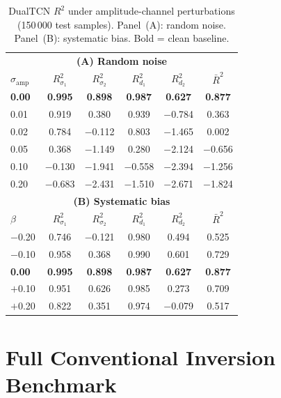 \documentclass[journal]{IEEEtran}
\begin{document}
\begin{table}[t]
  \centering
  \footnotesize
  \caption{DualTCN $R^2$ under amplitude-channel perturbations
  (150\,000 test samples).  Panel~(A): random noise.
  Panel~(B): systematic bias.  Bold = clean baseline.}
  \label{tab:supp_amp}
  \setlength{\tabcolsep}{2pt}
  \begin{tabular}{l@{\;\;}ccccc}
    \toprule
    \multicolumn{6}{c}{\textbf{(A) Random noise}} \\
    $\sigma_\mathrm{amp}$ &
      $R^2_{\sigma_1}$ & $R^2_{\sigma_2}$ & $R^2_{d_1}$ & $R^2_{d_2}$ & $\bar{R}^2$ \\
    \midrule
    \textbf{0.00} & \textbf{0.995} & \textbf{0.898} & \textbf{0.987} & \textbf{0.627} & \textbf{0.877} \\
    0.01 & 0.919 & 0.380 & 0.939 & $-$0.784 & 0.363 \\
    0.02 & 0.784 & $-$0.112 & 0.803 & $-$1.465 & 0.002 \\
    0.05 & 0.368 & $-$1.149 & 0.280 & $-$2.124 & $-$0.656 \\
    0.10 & $-$0.130 & $-$1.941 & $-$0.558 & $-$2.394 & $-$1.256 \\
    0.20 & $-$0.683 & $-$2.431 & $-$1.510 & $-$2.671 & $-$1.824 \\
    \midrule
    \multicolumn{6}{c}{\textbf{(B) Systematic bias}} \\
    $\beta$ &
      $R^2_{\sigma_1}$ & $R^2_{\sigma_2}$ & $R^2_{d_1}$ & $R^2_{d_2}$ & $\bar{R}^2$ \\
    \midrule
    $-$0.20 & 0.746 & $-$0.121 & 0.980 & 0.494 & 0.525 \\
    $-$0.10 & 0.958 & 0.368 & 0.990 & 0.601 & 0.729 \\
    \textbf{0.00} & \textbf{0.995} & \textbf{0.898} & \textbf{0.987} & \textbf{0.627} & \textbf{0.877} \\
    $+$0.10 & 0.951 & 0.626 & 0.985 & 0.273 & 0.709 \\
    $+$0.20 & 0.822 & 0.351 & 0.974 & $-$0.079 & 0.517 \\
    \bottomrule
  \end{tabular}
\end{table}


\section{Full Conventional Inversion Benchmark}
\label{sec:supp_benchmark}
\end{document}
